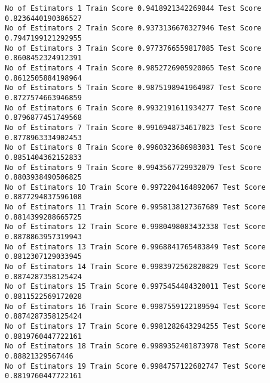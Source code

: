 \documentclass[11pt]{article}
\begin{document}
    \begin{Verbatim}[commandchars=\\\{\}]
No of Estimators 1 Train Score 0.9418921342269844 Test Score 0.8236440190386527
No of Estimators 2 Train Score 0.9373136670327946 Test Score 0.7947199121292955
No of Estimators 3 Train Score 0.9773766559817085 Test Score 0.8608452324912391
No of Estimators 4 Train Score 0.9852726905920065 Test Score 0.8612505884198964
No of Estimators 5 Train Score 0.9875198941964987 Test Score 0.8727574663946859
No of Estimators 6 Train Score 0.9932191611934277 Test Score 0.8796877451749568
No of Estimators 7 Train Score 0.9916948734617023 Test Score 0.8778963334902453
No of Estimators 8 Train Score 0.9960323686983031 Test Score 0.8851404362152833
No of Estimators 9 Train Score 0.9943567729932079 Test Score 0.8803938490506825
No of Estimators 10 Train Score 0.9972204164892067 Test Score 0.8877294837596108
No of Estimators 11 Train Score 0.9958138127367689 Test Score 0.8814399288665725
No of Estimators 12 Train Score 0.9980498083432338 Test Score 0.8878863957319943
No of Estimators 13 Train Score 0.9968841765483849 Test Score 0.8812307129033945
No of Estimators 14 Train Score 0.9983972562820829 Test Score 0.8874287358125424
No of Estimators 15 Train Score 0.9975454484320011 Test Score 0.8811522569172028
No of Estimators 16 Train Score 0.9987559122189594 Test Score 0.8874287358125424
No of Estimators 17 Train Score 0.9981282643294255 Test Score 0.8819760447722161
No of Estimators 18 Train Score 0.9989352401873978 Test Score 0.88821329567446
No of Estimators 19 Train Score 0.9984757122682747 Test Score 0.8819760447722161

    \end{Verbatim}
\end{document}
